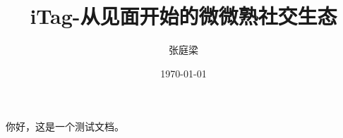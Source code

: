 \documentclass[UTF8]{ctexart}
\title{iTag-从见面开始的微微熟社交生态}
\author{张庭梁}
\date{\today}
\begin{document}
\maketitle

你好，这是一个测试文档。
\end{document}
